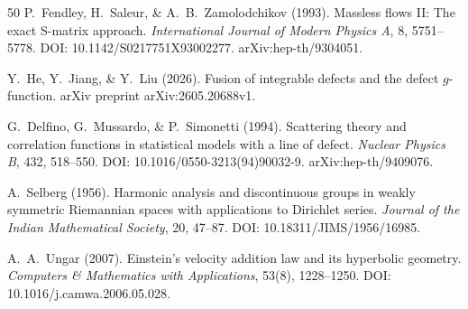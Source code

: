 \documentclass[aps,prd,twocolumn,superscriptaddress,nofootinbib]{revtex4-2}
\begin{document}
\begin{thebibliography}{50}
P.~Fendley, H.~Saleur, \& A.~B.~Zamolodchikov (1993).
Massless flows II: The exact S-matrix approach.
\textit{International Journal of Modern Physics A}, 8, 5751--5778.
DOI: 10.1142/S0217751X93002277. arXiv:hep-th/9304051.

Y.~He, Y.~Jiang, \& Y.~Liu (2026).
Fusion of integrable defects and the defect $g$-function.
arXiv preprint arXiv:2605.20688v1.

G.~Delfino, G.~Mussardo, \& P.~Simonetti (1994).
Scattering theory and correlation functions in statistical models with a line of defect.
\textit{Nuclear Physics B}, 432, 518--550.
DOI: 10.1016/0550-3213(94)90032-9. arXiv:hep-th/9409076.

A.~Selberg (1956).
Harmonic analysis and discontinuous groups in weakly symmetric Riemannian spaces with applications to Dirichlet series.
\textit{Journal of the Indian Mathematical Society}, 20, 47--87.
DOI: 10.18311/JIMS/1956/16985.

A.~A.~Ungar (2007).
Einstein's velocity addition law and its hyperbolic geometry.
\textit{Computers \& Mathematics with Applications}, 53(8), 1228--1250.
DOI: 10.1016/j.camwa.2006.05.028.

\end{thebibliography}
\end{document}
